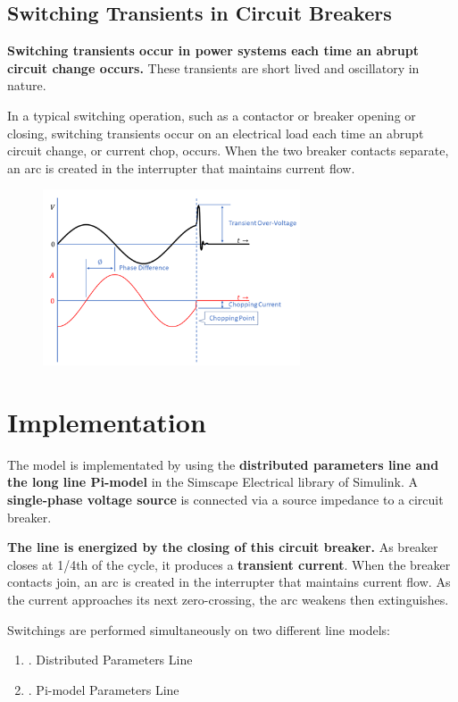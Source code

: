 \documentclass[12pt]{article}
\begin{document}
    \subsection{Switching Transients in Circuit Breakers}
    {\bf Switching transients occur in power systems each time an abrupt circuit 
    change occurs.} These transients are short lived and oscillatory in nature. 

    In a typical switching operation, such as a contactor or breaker 
    opening or closing, switching transients occur on an electrical load 
    each time an abrupt circuit change, or current chop, occurs.
    When the two breaker contacts separate, an arc is created in the 
    interrupter that maintains current flow. 
    \begin{figure}[H]
      \centering
      \includegraphics[width=3in]{img/switching-transient-graph.png}
    \end{figure}

  \pagebreak
  \section{Implementation}
  The model is implementated by using the {\bf distributed parameters line and the
  long line Pi-model} in the Simscape Electrical library of Simulink.
  A {\bf single-phase voltage source} is connected via a source impedance to a 
  circuit breaker. 
  
  {\bf The line is energized by the closing of this circuit breaker.}
  As breaker closes at 1/4th of the cycle, it produces a {\bf transient current}. 
  When the breaker contacts join, an arc is created in the 
  interrupter that maintains current flow. As the current approaches its next 
  zero-crossing, the arc weakens then extinguishes. 

  Switchings are performed simultaneously on two different line models:
  \begin{enumerate}[label=\Alph*]
    \item. Distributed Parameters Line
    \item. Pi-model Parameters Line
  \end{enumerate}
\end{document}
